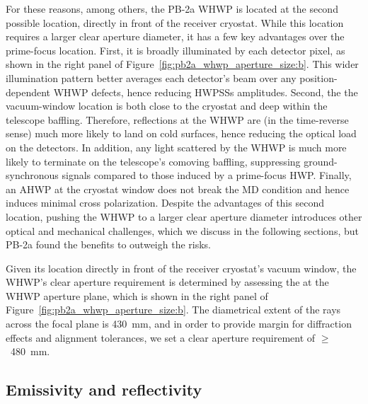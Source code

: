 For these reasons, among others, the PB-2a WHWP is located at the second possible location, directly in front of the receiver cryostat. While this location requires a larger clear aperture diameter, it has a few key advantages over the prime-focus location. First, it is broadly illuminated by each detector pixel, as shown in the right panel of Figure~\ref{fig:pb2a_whwp_aperture_size:b}. This wider illumination pattern better averages each detector's beam over any position-dependent WHWP defects, hence reducing HWPSSs amplitudes. Second, the the vacuum-window location is both close to the cryostat and deep within the telescope baffling. Therefore, reflections at the WHWP  are (in the time-reverse sense) much more likely to land on cold surfaces, hence reducing the optical load on the detectors. In addition, any light scattered by the WHWP is much more likely to terminate on the telescope's comoving baffling, suppressing ground-synchronous signals compared to those induced by a prime-focus HWP. Finally, an AHWP at the cryostat window does not break the MD condition and hence induces minimal cross polarization. Despite the advantages of this second location, pushing the WHWP to a larger clear aperture diameter introduces other optical and mechanical challenges, which we discuss in the following sections, but PB-2a found the benefits to outweigh the risks.

Given its location directly in front of the receiver cryostat's vacuum window, the WHWP's clear aperture requirement is determined by assessing the  at the WHWP aperture plane, which is shown in the right panel of Figure~\ref{fig:pb2a_whwp_aperture_size:b}. The diametrical extent of the rays across the focal plane is 430~mm, and in order to provide margin for diffraction effects and alignment tolerances, we set a clear aperture requirement of $\geq$~480~mm.


\subsection{Emissivity and reflectivity}
\label{sec:pb2a_whwp_emissivity_relfectivity_requirements}

